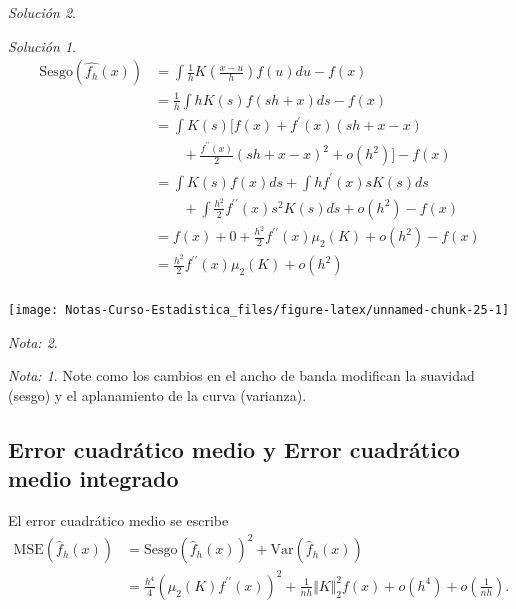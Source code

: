 \documentclass[
  12pt,
]{book}
\theoremstyle{definition}
\theoremstyle{definition}
\theoremstyle{definition}
\theoremstyle{remark}
\newtheorem*{remark}{Nota: }
\newtheorem*{solution}{Solución}
\begin{document}
\begin{solution}
\begin{solution}

{}\begin{align*}
\mathrm{Sesgo}(\hat{f_{h}}(x)) & = \int \frac{1}{h} K\left( \frac{x-u}{h} \right) f(u)du - f(x)     \\
& = \frac{1}{h} \int hK(s)f(sh+x) ds - f(x) \\
& = \int K(s)\Biggl[ f(x) + f^{\prime}(x)(sh+x-x)  \\
&  \qquad  + \frac{f^{\prime\prime}(x)}{2}(sh+x-x)^2 + o(h^{2}) \Biggr] - f(x) \\
& = \int K(s)f(x)ds + \int hf^{\prime}(x)sK(s) ds  \\
& \qquad  + \int \frac{h^2}{2} f^{\prime\prime}(x)s^2K(s) ds + o(h^2) - f(x) \\
& = f(x) + 0 + \frac{h^2}{2}f^{\prime\prime}(x)\mu_{2}(K) + o(h^2) - f(x)   \\
& = \frac{h^2}{2}f^{\prime\prime}(x)\mu_{2}(K) + o(h^2) \\
\end{align*}

\end{solution}
\end{solution}

\begin{center}\texttt{[image: Notas-Curso-Estadistica\_files/figure-latex/unnamed-chunk-25-1]} \end{center}

\begin{remark}
\begin{remark}

{}Note como los cambios en el ancho de banda modifican la suavidad (sesgo) y el aplanamiento de la curva (varianza).

\end{remark}
\end{remark}

\hypertarget{error-cuadruxe1tico-medio-y-error-cuadruxe1tico-medio-integrado}{%
\subsection{Error cuadrático medio y Error cuadrático medio integrado}\label{error-cuadruxe1tico-medio-y-error-cuadruxe1tico-medio-integrado}}

El error cuadrático medio se escribe
\begin{align*}
\mathrm{MSE}(\hat{f}_{h}(x))
& = \mathrm{Sesgo}\left(\hat{f}_{h}(x)\right)^{2} + \mathrm{Var}\left(\hat{f}_{h}(x)\right)                                                 \\
& = \frac{h^{4}}{4}\left(\mu_{2}(K)f^{\prime\prime}(x)\right)^{2}+\frac{1}{nh}\Vert K\Vert_{2}^{2}f(x)+o(h^{4})+o\left(\frac{1}{nh}\right).
\end{align*}
\end{document}
